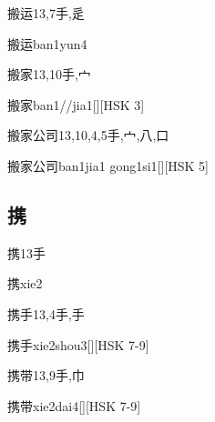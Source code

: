 \begin{Entry}{搬运}{13,7}{⼿,⾡}
  \begin{Phonetics}{搬运}{ban1yun4}
  \end{Phonetics}
\end{Entry}

\begin{Entry}{搬家}{13,10}{⼿,⼧}
  \begin{Phonetics}{搬家}{ban1//jia1}[][HSK 3]
  \end{Phonetics}
\end{Entry}

\begin{Entry}{搬家公司}{13,10,4,5}{⼿,⼧,⼋,⼝}
  \begin{Phonetics}{搬家公司}{ban1jia1 gong1si1}[][HSK 5]
  \end{Phonetics}
\end{Entry}

\subsection*{携}

\begin{Entry}{携}{13}{⼿}
  \begin{Phonetics}{携}{xie2}
  \end{Phonetics}
\end{Entry}

\begin{Entry}{携手}{13,4}{⼿,⼿}
  \begin{Phonetics}{携手}{xie2shou3}[][HSK 7-9]
  \end{Phonetics}
\end{Entry}

\begin{Entry}{携带}{13,9}{⼿,⼱}
  \begin{Phonetics}{携带}{xie2dai4}[][HSK 7-9]
  \end{Phonetics}
\end{Entry}

